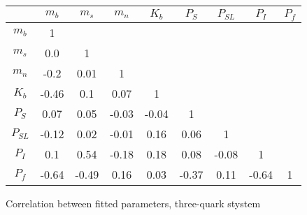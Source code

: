 \begin{tabular}{c  c  c  c  c  c  c  c  c}\hline \hline
         &  $m_{b}$       &     $m_{s}$    &    $m_{n}$  &      $K_b$    & $P_S$ & $P_{SL}$ & $P_I$ & $P_f$ \\ \hline
 $m_{b}$ &     1   &   &   &   &    &   &   &  \\ 
 $m_{s}$ & 0.0 &  1   &   &   &   &   &   &  \\ 
 $m_{n}$ & -0.2 & 0.01 &  1   &   &   &   &   & \\ 
 $K_b$   & -0.46 & 0.1 & 0.07 &  1   &   &   &   &   \\ 
 $P_S$   & 0.07 & 0.05 & -0.03 & -0.04 & 1 &   &   & \\ 
 $P_{SL}$& -0.12 & 0.02 & -0.01 & 0.16 & 0.06 & 1  &   & \\ 
 $P_I$   & 0.1 & 0.54 & -0.18 & 0.18 & 0.08 & -0.08 & 1  &  \\ 
 $P_f$   & -0.64 & -0.49 & 0.16 & 0.03 & -0.37 & 0.11 & -0.64 & 1 \\ \hline \hline
\end{tabular}
\caption{Correlation between fitted parameters, three-quark stystem }
\label{tab:3quark_corr}
